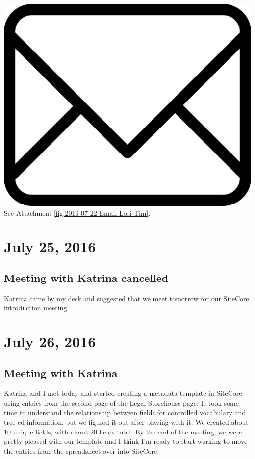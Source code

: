 \documentclass{article}
\begin{document}
\vspace{2em}
\noindent\includegraphics[height=\fontcharht\font`\B]{icons/attachment-email} See Attachment \ref{fig:2016-07-22-Email-Lori-Tim}.
\vspace{2em}

\section{July 25, 2016}
\subsection{Meeting with Katrina cancelled}
Katrina came by my desk and suggested that we meet tomorrow for our SiteCore introduction meeting.

\section{July 26, 2016}\label{2016-07-26}
\subsection{Meeting with Katrina}
Katrina and I met today and started creating a metadata template in SiteCore using entries from the second page of the Legal Storehouse page. It took some time to understand the relationship between fields for controlled vocabulary and tree-ed information, but we figured it out after playing with it. We created about 10 unique fields, with about 20 fields total. By the end of the meeting, we were pretty pleased with our template and I think I'm ready to start working to move the entries from the spreadsheet over into SiteCore. 
\end{document}
